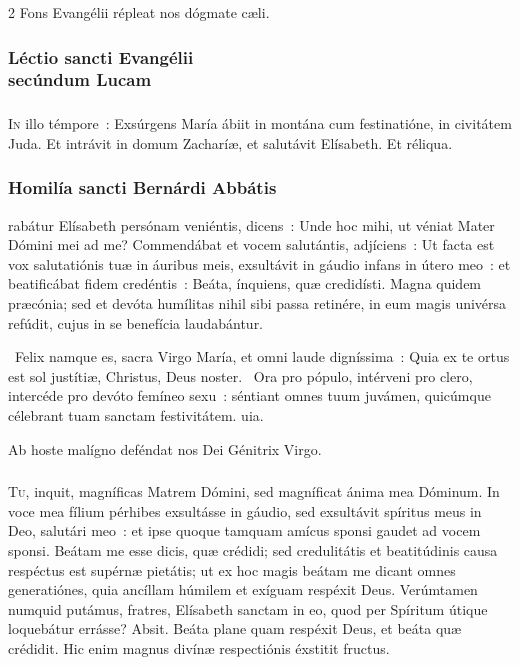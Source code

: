 \documentclass[9pt,twoside]{extarticle}
\begin{document}
\begin{multicols}{2}
\smallskip
\small {} Fons Evangélii répleat nos dógmate cæli.

\normalsize
\subsubsection*{\center  \normalfont Léctio sancti Evangélii\\ secúndum Lucam}
\subsubsection*{\center {}}
\lettrine{I}{n} illo témpore~: Exsúrgens María ábiit in montána cum festinatióne, in civitátem Juda. Et intrávit in domum Zacharíæ, et salutávit Elísabeth. Et réliqua.

\subsubsection*{\center \normalfont Homilía sancti Bernárdi Abbátis\\
\small {}}

\smallskip
{}rabátur Elísabeth persónam veniéntis, dicens~: Unde hoc mihi, ut véniat Mater Dómini mei ad me? Commendábat et vocem salutántis, adjíciens~: Ut facta est vox salutatiónis tuæ in áuribus meis, exsultávit in gáudio infans in útero meo~: et beatificábat fidem credéntis~: Beáta, ínquiens, quæ credidísti. Magna quidem præcónia; sed et devóta humílitas nihil sibi passa retinére, in eum magis univérsa refúdit, cujus in se benefícia laudabántur.

~Felix namque es, sacra Virgo María, et omni laude digníssima~: \textred{*} Quia ex te ortus est sol justítiæ, Christus, Deus noster.
~Ora pro pópulo, intérveni pro clero, intercéde pro devóto femíneo sexu~: séntiant omnes tuum juvámen, quicúmque célebrant tuam sanctam festivitátem. uia.
 
\smallskip
\small {} Ab hoste malígno deféndat nos Dei Génitrix Virgo.

\normalsize
\subsubsection*{\center {}}
\lettrine{T}{u}, inquit, magníficas Matrem Dómini, sed magníficat ánima mea Dóminum. In voce mea fílium pérhibes exsultásse in gáudio, sed exsultávit spíritus meus in Deo, salutári meo~: et ipse quoque tamquam amícus sponsi gaudet ad vocem sponsi. Beátam me esse dicis, quæ crédidi; sed credulitátis et beatitúdinis causa respéctus est supérnæ pietátis; ut ex hoc magis beátam me dicant omnes generatiónes, quia ancíllam húmilem et exíguam respéxit Deus. Verúmtamen numquid putámus, fratres, Elísabeth sanctam in eo, quod per Spíritum útique loquebátur errásse? Absit. Beáta plane quam respéxit Deus, et beáta quæ crédidit. Hic enim magnus divínæ respectiónis éxstitit fructus.


\end{multicols}
\end{document}
